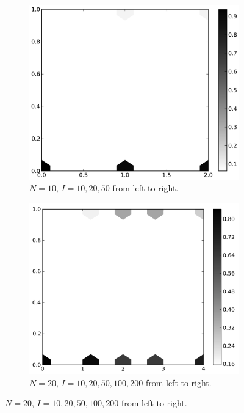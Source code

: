 \documentclass{amsart}
\begin{document}
\begin{figure}[h!tbp]  
  \begin{subfigure}{.485\linewidth}
    \centering
    \includegraphics[width=\linewidth]{pop10iter.png}
    \caption{$N=10$,  $I = 10, 20, 50$ from left to right.}
    \label{fig:pop10iter}
  \end{subfigure}
  \hspace{.01\linewidth}
  \begin{subfigure}{.485\linewidth}  
    \centering
    \includegraphics[width=\linewidth]{pop20iter.png}
    \caption{$N=20$,  $I = 10,20,50,100,200$ from left to right.}
    \label{fig:pop20iter}
  \end{subfigure}


\end{figure}
\end{document}
